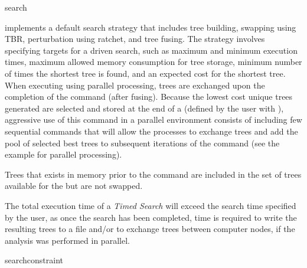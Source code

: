 
\begin{command}{search}{}


\begin{poydescription}
 implements a default search strategy that
includes tree building, swapping using TBR, perturbation using
ratchet, and tree fusing. The strategy involves specifying targets for 
a driven search, such as maximum and minimum execution times, 
maximum allowed memory consumption for tree storage, minimum number of times the
shortest tree is found, and an expected cost for the shortest tree. When executing
 using parallel processing, trees are exchanged upon the
completion of the command (after fusing). Because the lowest cost unique trees 
generated are selected and stored at the end of a  
(defined by the user with ), aggressive use of this 
command in a parallel environment consists of including few sequential
 commands that will allow the processes to
exchange trees and add the pool of selected best trees to subsequent 
iterations of the command (see the example for parallel processing).

Trees that exists in memory prior to the  command
are included in the set of trees available for the
 but are not swapped.
\end{poydescription}

\begin{statement}
The total execution time of a \emph{Timed Search} will exceed the search time 
specified by the user, as once the search has been completed, time is required to 
write the resulting trees to a file and/or to exchange trees between computer nodes, if the 
analysis was performed in parallel.
\end{statement}

\begin{arguments}

{searchconstraint}




\end{arguments}
\end{command}
